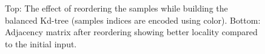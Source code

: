 \documentclass[12pt] {article}
\begin{document}
\begin{figure}[!tbh]
\centering        
   
  
   \caption{Top: The effect of reordering the samples while building the balanced Kd-tree (samples indices are encoded using color). Bottom: Adjacency matrix after reordering showing better locality compared to the initial input.}
   \label{fig:tree}
\end{figure}
\end{document}
